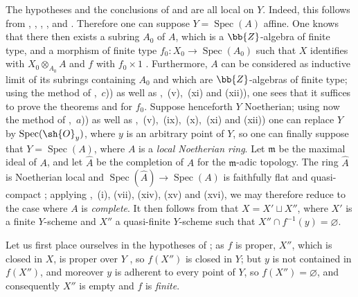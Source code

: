 \begin{env}[8.11.4]
\label{IV.8.11.4}
The hypotheses and the conclusions of  and  are all local on $Y$.
Indeed, this follows from , , , , and .
Therefore one can suppose $Y=\operatorname{Spec}(A)$ affine.
One knows that there then exists a subring $A_0$ of $A$, which is a $\bb{Z}$-algebra of finite type, and a morphism of finite type $f_0:X_0\to\operatorname{Spec}(A_0)$ such that $X$ identifies with $X_0\otimes_{A_0}A$ and $f$ with $f_0\times 1$ .
Furthermore, $A$ can be considered as inductive limit of its subrings containing $A_0$ and which are $\bb{Z}$-algebras of finite type; using the method of ,~$c$)) as well as ,~(v),~(xi) and (xii)), one sees that it suffices to prove the theorems  and  for $f_0$.
Suppose henceforth $Y$ Noetherian; using now the method of ,~$a$)) as well as ,~(v),~(ix),~(x),~(xi) and (xii)) one can replace $Y$ by $\operatorname{Spec}(\sh{O}_y)$, where $y$ is an
arbitrary point of $Y$, so one can finally suppose that $Y=\operatorname{Spec}(A)$, where $A$ is a \emph{local Noetherian ring}.
Let $\mathfrak{m}$ be the maximal ideal of $A$, and let $\hat{A}$ be the completion of $A$ for the $\mathfrak{m}$-adic topology. The ring $\hat{A}$ is Noetherian local and $\operatorname{Spec}(\hat{A})\to\operatorname{Spec}(A)$ is faithfully flat and quasi-compact ; applying ,~(i), (vii), (xiv), (xv) and (xvi), we may therefore reduce to the case where $A$ is \emph{complete}.
It then follows from  that $X=X'\sqcup X''$, where $X'$ is a finite $Y$-scheme and $X''$ a quasi-finite $Y$-scheme such that $X''\cap f^{-1}(y)=\varnothing$.
\end{env}

Let us first place ourselves in the hypotheses of ; as $f$ is proper, $X''$, which is closed in $X$, is proper over $Y$ , so $f(X'')$ is closed in $Y$; but $y$ is not contained in $f(X'')$, and moreover $y$ is adherent to every point of $Y$, so $f(X'')=\varnothing$, and consequently $X''$ is empty and $f$ is \emph{finite}.


